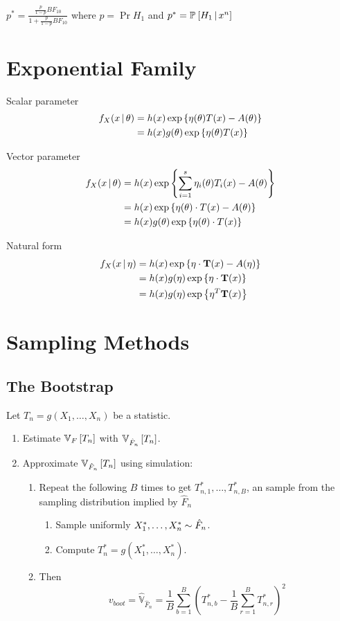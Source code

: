 \documentclass[landscape]{article}
\begin{document}
\begin{multicols*}{2}
$p^* = \displaystyle\frac{\frac{p}{1-p}BF_{10}}{1+\frac{p}{1-p}BF_{10}}$ where
$p=\Pr{H_1}$ and $p^* = \Pr{H_1 \giv x^n}$

\raggedright

\section{Exponential Family}

Scalar parameter
\begin{align*}
f_X(x \giv \theta) 
&= h(x) \Exp{\eta(\theta)T(x) - A(\theta)} \\
&= h(x) g(\theta) \Exp{\eta(\theta)T(x)}
\end{align*}

Vector parameter
\begin{align*}
f_X(x \giv \theta) 
&= h(x) \Exp{\sum_{i=1}^s\eta_i(\theta)T_i(x) - A(\theta)} \\
&= h(x) \Exp{\eta(\theta)\cdot T(x) - A(\theta)} \\
&= h(x) g(\theta)\Exp{\eta(\theta)\cdot T(x)}
\end{align*}

Natural form
\begin{align*}
f_X(x \giv \eta) 
&= h(x) \Exp{\eta\cdot \mathbf{T}(x) - A(\eta)} \\
&= h(x) g(\eta) \Exp{\eta\cdot \mathbf{T}(x)} \\
&= h(x) g(\eta) \Exp{\eta^T \mathbf{T}(x)}
\end{align*}

\section{Sampling Methods}

\subsection{The Bootstrap}

Let $T_n = g(X_1,\dots,X_n)$ be a statistic.
\begin{enumerate}
  \item Estimate $\V[F]{T_n}$ with $\V[\hat{F}_n]{T_n}$.
  \item Approximate $\V[\hat{F}_n]{T_n}$ using simulation:
    \begin{enumerate}
      \item Repeat the following $B$ times to get $T_{n,1}^*,\dots,T_{n,B}^*$,
        an \iid sample from the sampling distribution implied by $\hat{F}_n$
        \begin{enumerate}
          \item Sample uniformly $X_1^*,\dots,X_n^* \dist \hat{F}_n$.
          \item Compute $T_n^* = g(X_1^*,\dots,X_n^*)$.
        \end{enumerate}
      \item Then 
        $$v_{boot} = \hat{\mathbb{V}}_{\hat{F}_n} = 
          \displaystyle\frac{1}{B} \sum_{b=1}^B
            \left( T_{n,b}^* - \frac{1}{B} \sum_{r=1}^B T_{n,r}^* \right)^2$$
    \end{enumerate}
\end{enumerate}


\end{multicols*}
\end{document}

